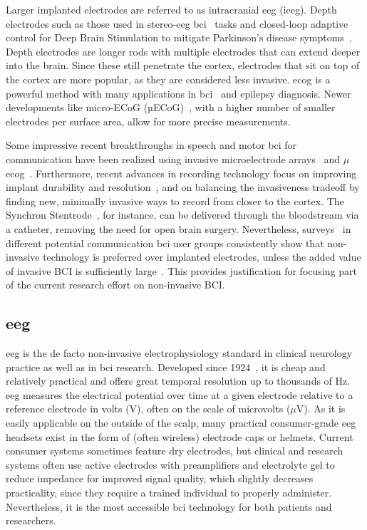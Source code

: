 Larger implanted electrodes are referred to as intracranial \ac{eeg} (i\ac{eeg}).
Depth electrodes such as those used in stereo-\ac{eeg} \ac{bci}~\cite{Wu2024} tasks and
closed-loop adaptive control for Deep Brain Stimulation to mitigate Parkinson's disease
symptoms~\cite{Arlotti2018}.
Depth electrodes are longer rods with multiple electrodes that can extend deeper into
the brain.
Since these still penetrate the cortex, electrodes that sit on top of the cortex are
more popular, as they are considered less invasive.
\Ac{ecog} is a powerful method with many applications in \ac{bci}~\cite{Schalk2011} and
epilepsy diagnosis.
Newer developments like micro-ECoG (µECoG)~\cite{Shokoueinejad2019}, with a higher
number of smaller electrodes per surface area, allow for more precise measurements.

Some impressive recent breakthroughs in speech and motor \ac{bci} for communication have
been realized using invasive microelectrode arrays~\cite{Willett2021} and
$\mu$\Ac{ecog}~\cite{Metzger2023}.
Furthermore, recent advances in recording technology focus on improving implant
durability and resolution~\cite{Steinmetz2021}, and on balancing the invasiveness
tradeoff by finding new, minimally invasive ways to record from closer to the cortex.
The Synchron Stentrode~\cite{Mitchell2023}, for instance, can be delivered through the
bloodstream via a catheter, removing the need for open brain surgery.
Nevertheless, surveys~\cite{Huggins2011, Huggins2015, Branco2021} in different
potential communication \ac{bci} user groups consistently show that non-invasive
technology is preferred over implanted electrodes, unless the added value of invasive
BCI is sufficiently large~\cite{Kageyama2020}.
This provides justification for focusing part of the current research effort on
non-invasive BCI.

\subsection{\Acl{eeg}}

\Ac{eeg} is the de facto non-invasive electrophysiology standard in clinical neurology
practice as well as in \ac{bci} research.
Developed since 1924~\cite{Berger1929}, it is cheap and relatively practical and offers
great temporal resolution up to thousands of Hz.
\Ac{eeg} measures the electrical potential over time at a given electrode relative to a
reference electrode in volts (V), often on the scale of microvolts ($\mu$V).
As it is easily applicable on the outside of the scalp, many practical consumer-grade
\ac{eeg} headsets exist in the form of (often wireless) electrode caps or helmets.
Current consumer systems sometimes feature dry electrodes, but clinical and research
systems often use active electrodes with preamplifiers and electrolyte gel to reduce
impedance for improved signal quality, which slightly decreases practicality, since they
require a trained individual to properly administer.
Nevertheless, it is the most accessible \ac{bci} technology for both patients and
researchers.


